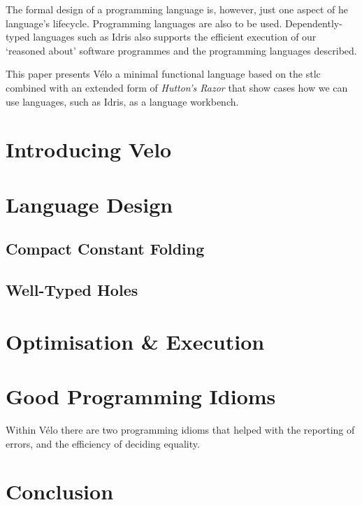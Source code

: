 \documentclass[%
draft, %
a4paper,
UKenglish,
cleveref,
autoref,
thm-restate,
pdfa
]{oasics-v2021}
\newcommand{\Velo}{V{\'e}lo\xspace}
\begin{document}
The formal design of a programming language is, however, just one aspect of he language's lifecycle.
Programming languages are also to be used.
Dependently-typed languages such as Idris also supports the efficient execution of our `reasoned about' software programmes and the programming languages described.

This paper presents \Velo{} a minimal functional language based on the \ac{stlc} combined with an extended form of \emph{Hutton's Razor} that show cases how we can use languages, such as Idris, as a language workbench.

\section{Introducing Velo}
\label{sec:velo}



\section{Language Design}
\label{sec:design}



\subsection{Compact Constant Folding}
\label{sec:design:constants}


\subsection{Well-Typed Holes}
\label{sec:design:holes}


\section{Optimisation \& Execution}
\label{sec:compiler}


\section{Good Programming Idioms}
\label{sec:idioms}

Within \Velo{} there are two programming idioms that helped
with the reporting of errors, and the efficiency of deciding equality.




\section{Conclusion}
\label{sec:conclusion}



\end{document}
